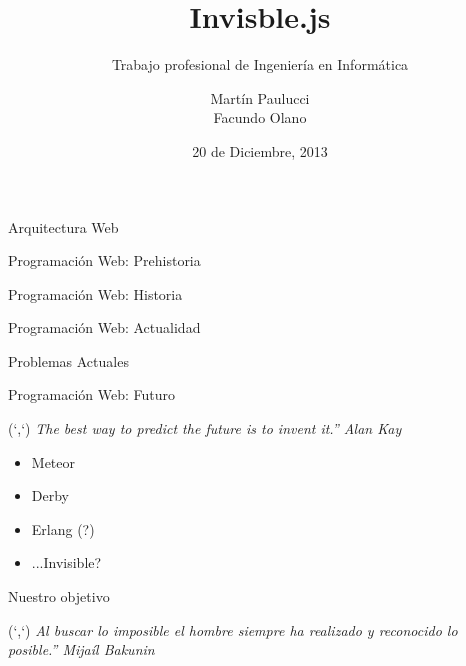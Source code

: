 \documentclass[xcolor=dvipsnames, 14pt]{beamer}
\title{Invisble.js}
\subtitle{Trabajo profesional de Ingeniería en Informática}
\author{
Martín Paulucci \\
Facundo Olano
}
\institute[UMBC]{
  Facultad de Ingeniería\\
  Universidad de Buenos Aires \\
}
\date{20 de Diciembre, 2013}
\newenvironment{reference}[2]{%
  \begin{textblock*}{\textwidth}(#1,#2)
      \footnotesize\it\bgroup\color{gray!50!black}}{\egroup\end{textblock*}}
\begin{document}
\begin{frame}[plain]
  \titlepage
\end{frame}

\begin{frame}{Arquitectura Web}
 

\end{frame}

\begin{frame}{Programación Web: Prehistoria}
\end{frame}

\begin{frame}{Programación Web: Historia}
\end{frame}

\begin{frame}{Programación Web: Actualidad}
\end{frame}

\begin{frame}{Problemas Actuales}
\end{frame}

\begin{frame}{Programación Web: Futuro}
\begin{reference}{4mm}{13mm}
``The best way to predict the future is to invent it.'' Alan Kay
\end{reference}
    \begin{itemize}
        \item Meteor
        \item Derby
        \item Erlang (?)
        \item ...Invisible?
    \end{itemize}
\end{frame}

\begin{frame}{Nuestro objetivo}
\begin{reference}{4mm}{13mm}
``Al buscar lo imposible el hombre siempre ha realizado y reconocido lo posible.'' Mijaíl Bakunin
\end{reference}

\end{frame}
\end{document}
